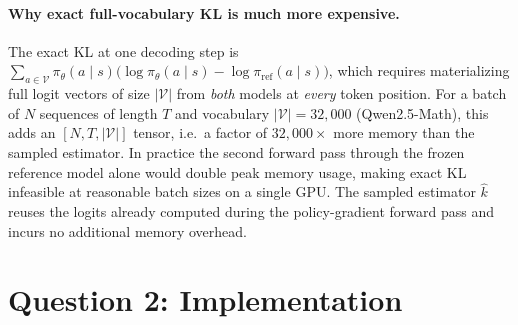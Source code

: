 \documentclass[11pt]{article}
\begin{document}
\paragraph{Why exact full-vocabulary KL is much more expensive.}
The exact KL at one decoding step is
$\sum_{a \in \mathcal{V}} \pi_\theta(a\mid s)\bigl(\log\pi_\theta(a\mid s) - \log\pi_{\mathrm{ref}}(a\mid s)\bigr)$,
which requires materializing full logit vectors of size $|\mathcal{V}|$ from \emph{both} models at
\emph{every} token position.
For a batch of $N$ sequences of length $T$ and vocabulary $|\mathcal{V}| = 32{,}000$
(Qwen2.5-Math), this adds an $[N, T, |\mathcal{V}|]$ tensor, i.e.\ a factor of
$32{,}000\times$ more memory than the sampled estimator.
In practice the second forward pass through the frozen reference model alone would double peak
memory usage, making exact KL infeasible at reasonable batch sizes on a single GPU.
The sampled estimator $\hat{k}$ reuses the logits already computed during the policy-gradient
forward pass and incurs no additional memory overhead.

\section*{Question 2: Implementation}
\end{document}
